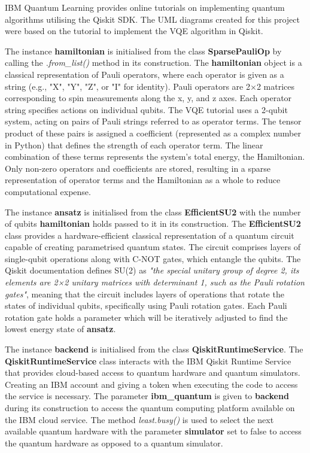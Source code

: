 \documentclass{article}
\newcounter{subsubsubsection}[subsubsection]
\begin{document}
{

IBM Quantum Learning provides online tutorials\cite{Tutorial} on implementing quantum algorithms utilising the Qiskit SDK. The UML diagrams created for this project were based on the tutorial to implement the VQE algorithm in Qiskit\cite{IBM2024}.

The instance \textbf{hamiltonian} is initialised from the class \textbf{SparsePauliOp} by calling the \textit{.from\_list()} method in its construction. The \textbf{hamiltonian} object is a classical representation of Pauli operators, where each operator is given as a string (e.g., "X", "Y", "Z", or "I" for identity). Pauli operators are 2×2 matrices corresponding to spin measurements along the x, y, and z axes\cite{DJORDJEVIC201229}. Each operator string specifies actions on individual qubits. The VQE tutorial uses a 2-qubit system, acting on pairs of Pauli strings referred to as operator terms. The tensor product of these pairs is assigned a coefficient (represented as a complex number in Python) that defines the strength of each operator term. The linear combination of these terms represents the system's total energy, the Hamiltonian. Only non-zero operators and coefficients are stored, resulting in a sparse representation of operator terms and the Hamiltonian as a whole to reduce computational expense.

The instance \textbf{ansatz} is initialised from the class \textbf{EfficientSU2} with the number of qubits \textbf{hamiltonian} holds passed to it in its construction. The \textbf{EfficientSU2} class provides a hardware-efficient classical representation of a quantum circuit capable of creating parametrised quantum states. The circuit comprises layers of single-qubit operations along with C-NOT gates, which entangle the qubits. The Qiskit documentation defines SU(2) as \textit{"the special unitary group of degree 2, its elements are 2×2 unitary matrices with determinant 1, such as the Pauli rotation gates"}\cite{EfficientSU2}, meaning that the circuit includes layers of operations that rotate the states of individual qubits, specifically using Pauli rotation gates. Each Pauli rotation gate holds a parameter which will be iteratively adjusted to find the lowest energy state of \textbf{ansatz}.

The instance \textbf{backend} is initialised from the class \textbf{QiskitRuntimeService}. The \textbf{QiskitRuntimeService} class interacts with the IBM Qiskit Runtime Service that provides cloud-based access to quantum hardware and quantum simulators. Creating an IBM account and giving a token when executing the code to access the service is necessary. The parameter \textbf{ibm\_quantum} is given to \textbf{backend} during its construction to access the quantum computing platform available on the IBM cloud service. The method \textit{least.busy()} is used to select the next available quantum hardware with the parameter \textbf{simulator} set to false to access the quantum hardware as opposed to a quantum simulator. 

}
\end{document}
